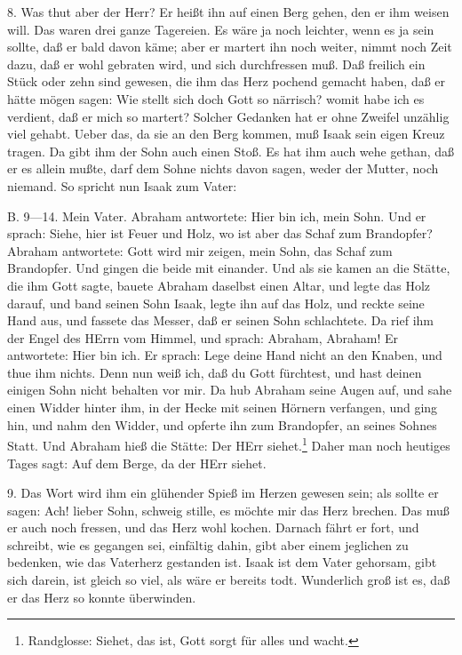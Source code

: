 8. Was thut aber der Herr? Er heißt ihn auf einen Berg gehen, den er ihm weisen will. Das waren drei ganze Tagereien. Es wäre ja noch leichter, wenn es ja sein sollte, daß er bald davon käme; aber er martert ihn noch weiter, nimmt noch Zeit dazu, daß er wohl gebraten wird, und sich durchfressen muß. Daß freilich ein Stück oder zehn sind gewesen, die ihm das Herz pochend gemacht haben, daß er hätte mögen sagen: Wie stellt sich doch Gott so närrisch? womit habe ich es verdient, daß er mich so martert? Solcher Gedanken hat er ohne Zweifel unzählig viel gehabt. Ueber das, da sie an den Berg kommen, muß Isaak sein eigen Kreuz tragen. Da gibt ihm der Sohn auch einen Stoß. Es hat ihm auch wehe gethan, daß er es allein mußte, darf dem Sohne nichts davon sagen, weder der Mutter, noch niemand. So spricht nun Isaak zum Vater:

B. 9—14. Mein Vater. Abraham antwortete: Hier bin ich, mein Sohn. Und er sprach: Siehe, hier ist Feuer und Holz, wo ist aber das Schaf zum Brandopfer? Abraham antwortete: Gott
wird mir zeigen, mein Sohn, das Schaf zum Brandopfer. Und gingen die beide mit einander. Und als sie kamen an die Stätte, die ihm Gott sagte, bauete Abraham daselbst einen Altar, und legte das Holz darauf, und band seinen Sohn Isaak, legte ihn auf das Holz, und reckte seine Hand aus, und fassete das Messer, daß er seinen Sohn schlachtete. Da rief ihm der Engel des HErrn vom Himmel, und sprach: Abraham, Abraham! Er antwortete: Hier bin ich. Er sprach: Lege deine Hand nicht an den Knaben, und thue ihm nichts. Denn nun weiß ich, daß du Gott fürchtest, und hast deinen einigen Sohn nicht behalten vor mir. Da hub Abraham seine Augen auf, und sahe einen Widder hinter ihm, in der Hecke mit seinen Hörnern verfangen, und ging hin, und nahm den Widder, und opferte ihn zum Brandopfer, an seines Sohnes Statt. Und Abraham hieß die Stätte: Der HErr siehet.\footnote{Randglosse: Siehet, das ist, Gott sorgt für alles und wacht.} Daher man noch heutiges Tages sagt: Auf dem Berge, da der HErr siehet.

9. Das Wort wird ihm ein glühender Spieß im Herzen gewesen sein; als sollte er sagen: Ach! lieber Sohn, schweig stille, es möchte mir das Herz brechen. Das muß er auch noch fressen, und das Herz wohl kochen. Darnach fährt er fort, und schreibt, wie es gegangen sei, einfältig dahin, gibt aber einem jeglichen zu bedenken, wie das Vaterherz gestanden ist. Isaak ist dem Vater gehorsam, gibt sich darein, ist gleich so viel, als wäre er bereits todt. Wunderlich groß ist es, daß er das Herz so konnte überwinden.


